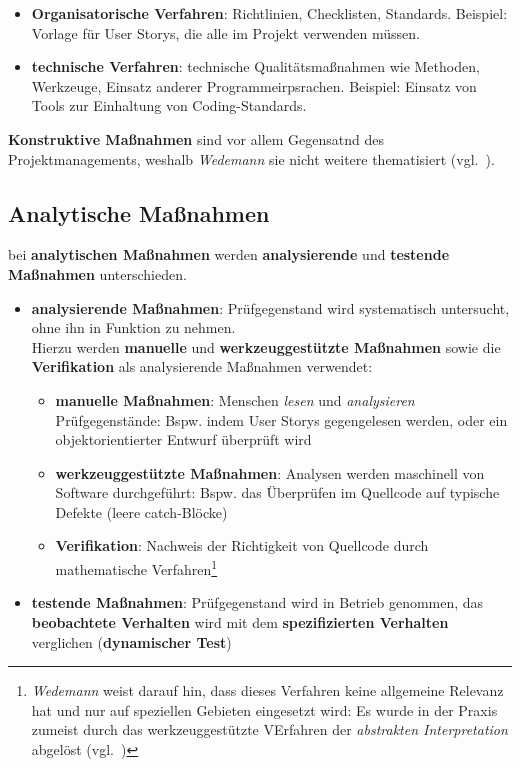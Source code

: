 \begin{itemize}
    \item \textbf{Organisatorische Verfahren}: Richtlinien, Checklisten, Standards. Beispiel: Vorlage für User Storys, die alle im Projekt verwenden müssen.
    \item \textbf{technische Verfahren}: technische Qualitätsmaßnahmen wie Methoden, Werkzeuge, Einsatz anderer Programmeirpsrachen. Beispiel: Einsatz von Tools zur Einhaltung von Coding-Standards.
\end{itemize}

\noindent
\textbf{Konstruktive Maßnahmen} sind vor allem Gegensatnd des Projektmanagements, weshalb \textit{Wedemann} sie nicht weitere thematisiert (vgl.~\cite[9]{Wed09c}).


\subsection*{Analytische Maßnahmen}
bei \textbf{analytischen Maßnahmen} werden \textbf{analysierende} und \textbf{testende Maßnahmen} unterschieden.

\begin{itemize}
    \item \textbf{analysierende Maßnahmen}: Prüfgegenstand wird systematisch untersucht, ohne ihn in Funktion zu nehmen.\\
    Hierzu werden \textbf{manuelle} und \textbf{werkzeuggestützte Maßnahmen} sowie die \textbf{Verifikation} als analysierende Maßnahmen verwendet:
    \begin{itemize}
        \item \textbf{manuelle Maßnahmen}: Menschen \textit{lesen} und \textit{analysieren} Prüfgegenstände: Bspw. indem User Storys gegengelesen werden, oder ein objektorientierter Entwurf überprüft wird
        \item \textbf{werkzeuggestützte Maßnahmen}: Analysen werden maschinell von Software durchgeführt: Bspw. das Überprüfen im Quellcode auf typische Defekte (leere catch-Blöcke)
        \item \textbf{Verifikation}: Nachweis der Richtigkeit von Quellcode durch mathematische Verfahren\footnote{
        \textit{Wedemann} weist darauf hin, dass dieses Verfahren keine allgemeine Relevanz hat und nur auf speziellen Gebieten eingesetzt wird: Es wurde in der Praxis zumeist durch das werkzeuggestützte VErfahren der \textit{abstrakten Interpretation} abgelöst (vgl.~\cite[9]{Wed09c})
        }
    \end{itemize}
    \item  \textbf{testende Maßnahmen}: Prüfgegenstand wird in Betrieb genommen, das \textbf{beobachtete Verhalten} wird mit dem \textbf{spezifizierten Verhalten} verglichen (\textbf{dynamischer Test})
\end{itemize}

